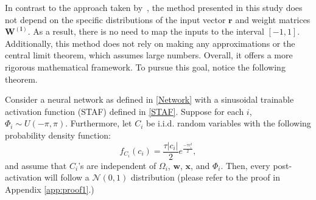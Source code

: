 In contrast to the approach taken by~\citep{Siren}, the method presented in this study does not depend on the specific distributions of the input vector $\boldsymbol{r}$ and weight matrices $\boldsymbol{W^{(l)}}$. As a result, there is no need to map the inputs to the interval $[-1,1]$. Additionally, this method does not rely on making any approximations or the central limit theorem, which assumes large numbers. Overall, it offers a more rigorous mathematical framework. To pursue this goal, notice the following theorem.

\begin{theorem} \label{initialization_theorem}
Consider a neural network as defined in \eqref{Network} with a sinusoidal trainable activation function (STAF) defined in \eqref{STAF}. Suppose for each $i$, $\Phi_i \sim U(-\pi, \pi)$. Furthermore, let $C_i$ be i.i.d. random variables with the following probability density function:
\begin{equation}
f_{C_i}(c_i) = \frac{\tau |c_i|}{2} e^{\frac{-\tau c_i^2}{2}},
\end{equation}
and assume that $C_i$'s are independent of $\Omega_i$, $\boldsymbol{w}$, $\boldsymbol{x}$, and $\Phi_i$. Then, every post-activation will follow a $\mathcal{N}(0, 1)$ distribution (please refer to the proof in Appendix \ref{app:proof1}.)
\end{theorem}




